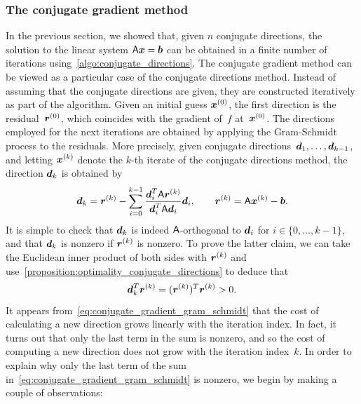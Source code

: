 \subsubsection{The conjugate gradient method}%
\label{ssub:the_conjugate_gradient_method}
In the previous section,
we showed that, given $n$ conjugate directions,
the solution to the linear system $\mathsf A \mathbf{\boldsymbol{x}} = \mathbf{\boldsymbol{b}}$ can be obtained in a finite number of iterations using~\cref{algo:conjugate_directions}.
The conjugate gradient method can be viewed as a particular case of the conjugate directions method.
Instead of assuming that the conjugate directions are given,
they are constructed iteratively as part of the algorithm.
Given an initial guess $\mathbf{\boldsymbol{x}}^{(0)}$,
the first direction is the residual~$\mathbf{\boldsymbol{r}}^{(0)}$,
which coincides with the gradient of~$f$ at~$\mathbf{\boldsymbol{x}}^{(0)}$.
The directions employed for the next iterations are obtained by applying the Gram-Schmidt process
to the residuals.
More precisely, given conjugate directions~$\mathbf{\boldsymbol{d}}_1, \dotsc, \mathbf{\boldsymbol{d}}_{k-1}$,
and letting $\mathbf{\boldsymbol{x}}^{(k)}$ denote the $k$-th iterate of the conjugate directions method,
the direction $\mathbf{\boldsymbol{d}}_k$ is obtained by
\begin{equation}
    \label{eq:conjugate_gradient_gram_schmidt}
    \mathbf{\boldsymbol{d}}_k = \mathbf{\boldsymbol{r}}^{(k)} - \sum_{i=0}^{k-1} \frac{\mathbf{\boldsymbol{d}}_i^T \mathsf A \mathbf{\boldsymbol{r}}^{(k)}}{\mathbf{\boldsymbol{d}}_i^T \mathsf A \mathbf{\boldsymbol{d}}_i} \mathbf{\boldsymbol{d}}_i,
    \qquad \mathbf{\boldsymbol{r}}^{(k)} = \mathsf A \mathbf{\boldsymbol{x}}^{(k)} - \mathbf{\boldsymbol{b}}.
\end{equation}
It is simple to check that $\mathbf{\boldsymbol{d}}_k$  is indeed $\mathsf A$-orthogonal to $\mathbf{\boldsymbol{d}}_i$ for $i \in \{0, \dotsc, k-1\}$,
and that $\mathbf{\boldsymbol{d}}_k$ is nonzero if $\mathbf{\boldsymbol{r}}^{(k)}$ is nonzero.
To prove the latter claim,
we can take the Euclidean inner product of both sides with $\mathbf{\boldsymbol{r}}^{(k)}$ and use~\cref{proposition:optimality_conjugate_directions}
to deduce that
\begin{equation}
    \label{eq:conjugate_gradient_positive_omega}
    \mathbf{\boldsymbol{d}}_k^T \mathbf{\boldsymbol{r}}^{(k)} = (\mathbf{\boldsymbol{r}}^{(k)} )^T \mathbf{\boldsymbol{r}}^{(k)} > 0.
\end{equation}
It appears from~\eqref{eq:conjugate_gradient_gram_schmidt} that the cost of calculating a new direction grows linearly with the iteration index.
In fact, it turns out that only the last term in the sum is nonzero,
and so the cost of computing a new direction does not grow with the iteration index~$k$.
In order to explain why only the last term of the sum in~\eqref{eq:conjugate_gradient_gram_schmidt} is nonzero,
we begin by making a couple of observations:
